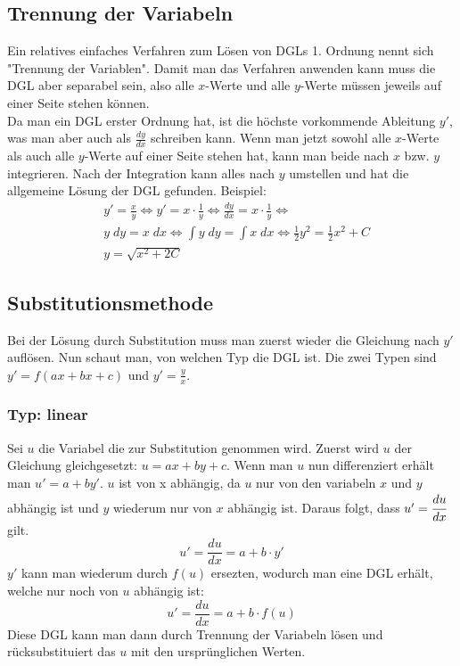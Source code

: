 \documentclass[a4paper,10pt]{scrartcl}
\begin{document}
        \subsection{Trennung der Variabeln}
        Ein relatives einfaches Verfahren zum Lösen von DGLs 1. Ordnung nennt sich "Trennung der Variablen". Damit man das Verfahren anwenden kann muss die DGL aber
        separabel sein, also alle \(x\)-Werte und alle \(y\)-Werte müssen jeweils auf einer Seite stehen können. \\
        Da man ein DGL erster Ordnung hat, ist die höchste vorkommende Ableitung \(y'\), was man aber auch als \(\frac{dy}{dx}\) schreiben kann. Wenn man jetzt sowohl alle 
        \(x\)-Werte als auch alle \(y\)-Werte auf einer Seite stehen hat, kann man beide nach \(x\) bzw. \(y\) integrieren. Nach der Integration kann alles nach \(y\) umstellen
        und hat die allgemeine Lösung der DGL gefunden. Beispiel:
        \begin{equation}
            \begin{aligned}  
            & y' = \frac{x}{y} \Leftrightarrow y' = x \cdot \frac{1}{y} \Leftrightarrow \frac{dy}{dx} = x \cdot \frac{1}{y}  \Leftrightarrow \\
            & y \; dy = x \; dx  \Leftrightarrow \int y \; dy = \int x \; dx \Leftrightarrow \frac{1}{2} y^2 = \frac{1}{2} x^2 + C \\
            & y = \sqrt{x^2 + 2C}
            \end{aligned}  
        \end{equation}
        
        \subsection{Substitutionsmethode}
        Bei der Lösung durch Substitution muss man zuerst wieder die Gleichung nach \(y'\) auflösen. Nun schaut man, von welchen Typ die DGL ist.
        Die zwei Typen sind \(y' = f(ax + bx + c)\) und \(y' = \frac{y}{x}\).
        \subsubsection{Typ: linear}
        Sei \(u\) die Variabel die zur Substitution genommen wird. Zuerst wird \(u\) der Gleichung gleichgesetzt: \(u = ax + by +c\). Wenn man \(u\) nun
        differenziert erhält man \(u' = a + by'\). \(u\) ist von x abhängig, da \(u\) nur von den variabeln \(x\) und \(y\) abhängig ist und \(y\) wiederum 
        nur von \(x\) abhängig ist. Daraus folgt, dass \(u' = \cfrac{du}{dx}\) gilt. 
        \begin{equation}
            u' = \frac{du}{dx} = a + b \cdot y'
        \end{equation}
        \(y'\) kann man wiederum durch \(f(u)\) ersezten, wodurch man eine DGL erhält, welche nur noch von \(u\) abhängig ist: 
        \begin{equation}
            u' = \frac{du}{dx} = a + b \cdot f(u)
        \end{equation}
        Diese DGL kann man dann durch Trennung der Variabeln lösen und rücksubstituiert das \(u\) mit den ursprünglichen Werten.
\end{document}
